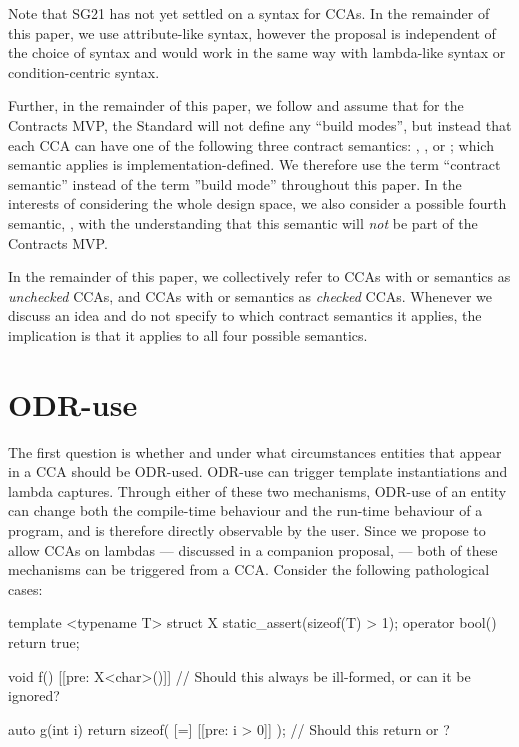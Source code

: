 Note that SG21 has not yet settled on a syntax for CCAs. In the remainder of this paper, we use attribute-like syntax, however the proposal is independent of the choice of syntax and would work in the same way with lambda-like syntax or condition-centric syntax.

Further, in the remainder of this paper, we follow \cite{P2877R0} and assume that for the Contracts MVP, the Standard will not define any ``build modes'', but instead that each CCA can have one of the following three contract semantics: , , or ; which semantic applies is implementation-defined. We therefore use the term ``contract semantic'' instead of the term ''build mode'' throughout this paper. In the interests of considering the whole design space, we also consider a possible fourth semantic, , with the understanding that this semantic will \emph{not} be part of the Contracts MVP.

In the remainder of this paper, we collectively refer to CCAs with  or  semantics as \emph{unchecked} CCAs, and CCAs with  or  semantics as \emph{checked} CCAs. Whenever we discuss an idea and do not specify to which contract semantics it applies, the implication is that it applies to all four possible semantics.

\section{ODR-use}

The first question is whether and under what circumstances entities that appear in a CCA should be ODR-used. ODR-use can trigger template instantiations and lambda captures. Through either of these two mechanisms, ODR-use of an entity can change both the compile-time behaviour and the run-time behaviour of a program, and is therefore directly observable by the user. Since we propose to allow CCAs on lambdas --- discussed in a companion proposal, \cite{P2890R0} --- both of these mechanisms can be triggered from a CCA. Consider the following pathological cases:

\begin{codeblock}
template <typename T>
struct X {
  static_assert(sizeof(T) > 1);
  operator bool() { return true; }
}

void f()
  [[pre: X<char>()]] // Should this always be ill-formed, or can it be ignored?
{}

auto g(int i) {
  return sizeof( [=] [[pre: i > 0]] {});  // Should this return  or ?
}
\end{codeblock}

